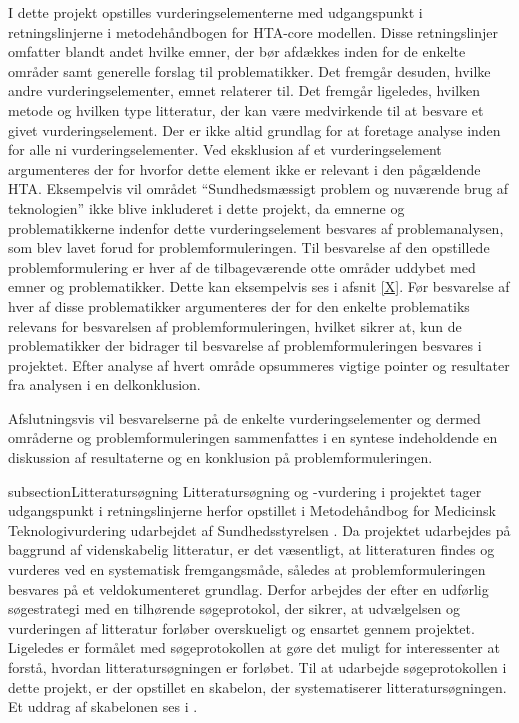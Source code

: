 I dette projekt opstilles vurderingselementerne med udgangspunkt i retningslinjerne i metodehåndbogen for HTA-core modellen. Disse retningslinjer omfatter blandt andet hvilke emner, der bør afdækkes inden for de enkelte områder samt generelle forslag til problematikker. Det fremgår desuden, hvilke andre vurderingselementer, emnet relaterer til. Det fremgår ligeledes, hvilken metode og hvilken type litteratur, der kan være medvirkende til at besvare et givet vurderingselement. \citep{HTAcore} 
Der er ikke altid grundlag for at foretage analyse inden for alle ni vurderingselementer. Ved eksklusion  af et vurderingselement argumenteres der for hvorfor dette element ikke er relevant i den pågældende HTA. \citep{HTAcore} Eksempelvis vil området “Sundhedsmæssigt problem og nuværende brug af teknologien” ikke blive inkluderet i dette projekt, da emnerne og problematikkerne indenfor dette vurderingselement besvares af problemanalysen, som blev lavet forud for problemformuleringen. 
Til besvarelse af den opstillede problemformulering er hver af de tilbageværende otte områder uddybet med emner og problematikker. Dette kan eksempelvis ses i afsnit \ref{X}. 
Før besvarelse af hver af disse problematikker argumenteres der for den enkelte problematiks relevans for besvarelsen af problemformuleringen, hvilket sikrer at, kun de problematikker der bidrager til  besvarelse af problemformuleringen besvares i projektet. Efter analyse af hvert område opsummeres vigtige pointer og resultater fra analysen i en delkonklusion.

Afslutningsvis vil besvarelserne på de enkelte vurderingselementer og dermed områderne og problemformuleringen sammenfattes i en syntese indeholdende en diskussion af resultaterne og en konklusion på problemformuleringen. 

subsection{Litteratursøgning}
Litteratursøgning og -vurdering i projektet tager udgangspunkt i retningslinjerne herfor opstillet i Metodehåndbog for Medicinsk Teknologivurdering udarbejdet af Sundhedsstyrelsen \citep{1}. Da projektet udarbejdes på baggrund af videnskabelig litteratur, er det væsentligt, at litteraturen findes og vurderes ved en systematisk fremgangsmåde, således at problemformuleringen besvares på et veldokumenteret grundlag. Derfor arbejdes der efter en udførlig søgestrategi med en tilhørende søgeprotokol, der sikrer, at udvælgelsen og vurderingen af litteratur forløber overskueligt og ensartet gennem projektet. Ligeledes er formålet med søgeprotokollen at gøre det muligt for interessenter at forstå, hvordan litteratursøgningen er forløbet. \citep{metodehaandbogen}
Til at udarbejde søgeprotokollen i dette projekt, er der opstillet en skabelon, der systematiserer litteratursøgningen. Et uddrag af skabelonen ses i . 

